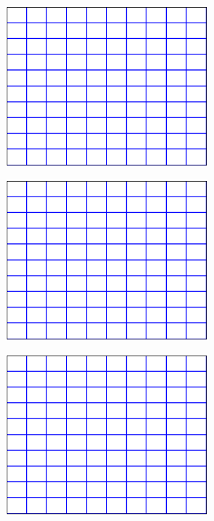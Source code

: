 \documentclass[11pt]{article}
\numberwithin{equation}{section}    %
\begin{document}
\newpage

\vspace{5in}
\pagestyle{empty}
\begin{figure}[h!]
\centering
\includegraphics[width=3in]{grid1}
\end{figure}


\newpage

\vspace{5in}
\pagestyle{empty}
\begin{figure}[h!]
\centering
\includegraphics[width=3in]{grid1}
\end{figure}

\newpage

\vspace{5in}
\pagestyle{empty}
\begin{figure}[h!]
\centering
\includegraphics[width=3in]{grid1}
\end{figure}
\end{document}
